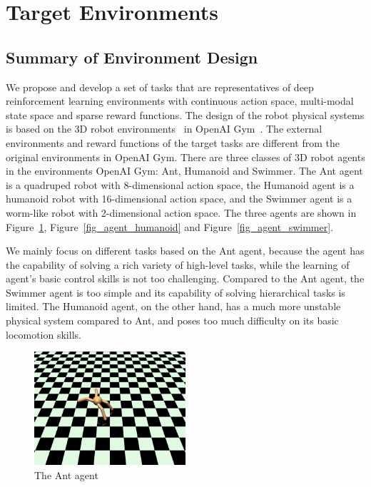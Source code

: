 \section{Target Environments}\label{sec_env}
\subsection{Summary of Environment Design}
We propose and develop a set of tasks that are representatives of deep reinforcement learning environments with continuous action space, multi-modal state space and sparse reward functions. The design of the robot physical systems is based on the 3D robot environments~\cite{roboschool_2018} in OpenAI Gym~\cite{openaigym}. The external environments and reward functions of the target tasks are different from the original environments in OpenAI Gym. There are three classes of 3D robot agents in the environments OpenAI Gym: Ant, Humanoid and Swimmer. The Ant agent is a quadruped robot with 8-dimensional action space, the Humanoid agent is a humanoid robot with 16-dimensional action space, and the Swimmer agent is a worm-like robot with 2-dimensional action space.  The three agents are shown in Figure~\ref{fig_agent_ant}, Figure~\ref{fig_agent_humanoid} and Figure~\ref{fig_agent_swimmer}.

We mainly focus on different tasks based on the Ant agent, because the agent has the capability of solving a rich variety of high-level tasks, while the learning of agent's basic control skills is not too challenging. 
Compared to the Ant agent, the Swimmer agent is too simple and its capability of solving hierarchical tasks is limited. The Humanoid agent, on the other hand, has a much more unstable physical system compared to Ant, and poses too much difficulty on its basic locomotion skills.
\begin{figure}[H]
	\includegraphics[width=0.5\textwidth]{images/agent_ant.png}
	\centering
	\caption{The Ant agent}\label{fig_agent_ant}
\end{figure}

